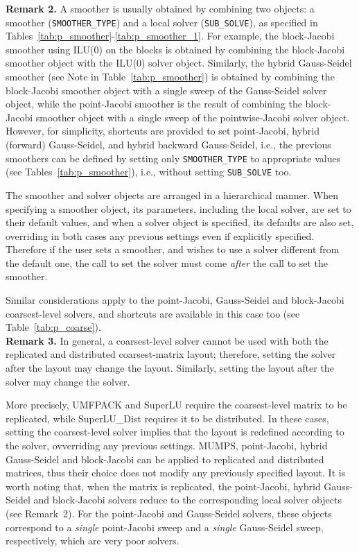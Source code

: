 \textbf{Remark 2.} A smoother is usually obtained by combining two objects:
a smoother (\verb|SMOOTHER_TYPE|) and a local solver (\verb|SUB_SOLVE|),
as specified in Tables~\ref{tab:p_smoother}-\ref{tab:p_smoother_1}.
For example, the block-Jacobi smoother using
ILU(0) on the blocks is obtained by combining the block-Jacobi smoother
object with the ILU(0) solver object. Similarly,
the hybrid Gauss-Seidel smoother (see Note in Table~\ref{tab:p_smoother})
is obtained by combining the block-Jacobi smoother object with a single sweep
of the Gauss-Seidel solver object, while the point-Jacobi smoother is the
result of combining the block-Jacobi smoother object with a single sweep
of the pointwise-Jacobi solver object. However, for simplicity, shortcuts are
provided to set point-Jacobi, hybrid (forward) Gauss-Seidel, and
hybrid backward Gauss-Seidel, i.e., the previous smoothers can be defined
by setting only \verb|SMOOTHER_TYPE| to appropriate values (see
Tables~\ref{tab:p_smoother}), i.e., without setting
\verb|SUB_SOLVE| too.

The smoother and solver objects are arranged in a
hierarchical manner. When specifying a smoother object, its parameters,
including the local solver, are set to their default values, and when a solver
object is specified, its defaults are also set, overriding in both
cases any previous settings even if explicitly specified. Therefore if
the user sets a smoother, and wishes to use a solver
different from  the default one, the call to set the solver must come
\emph{after} the call to set the smoother. 

Similar considerations apply to the point-Jacobi, Gauss-Seidel and block-Jacobi
coarsest-level solvers, and shortcuts are available
in this case too (see Table~\ref{tab:p_coarse}). \\

\textbf{Remark 3.} In general, a coarsest-level solver cannot be used with
both the replicated and distributed coarsest-matrix layout;
therefore, setting the solver after the layout may change the layout.
Similarly, setting the layout after the solver may change the solver.

More precisely, UMFPACK and SuperLU require the coarsest-level
matrix to be replicated, while SuperLU\_Dist requires it to be distributed.
In these cases, setting the coarsest-level solver implies that
the layout is redefined according to the solver, ovverriding any
previous settings. MUMPS,  point-Jacobi,
hybrid Gauss-Seidel and block-Jacobi can be applied to
replicated and distributed matrices, thus their choice
does not modify any previously specified layout.
It is worth noting that, when the matrix is replicated,
the point-Jacobi, hybrid Gauss-Seidel and block-Jacobi solvers
reduce to the corresponding local solver objects (see Remark~2).
For the point-Jacobi and Gauss-Seidel solvers, these objects
correspond to a \emph{single} point-Jacobi sweep and a \emph{single} 
Gauss-Seidel sweep, respectively, which are very poor solvers.


